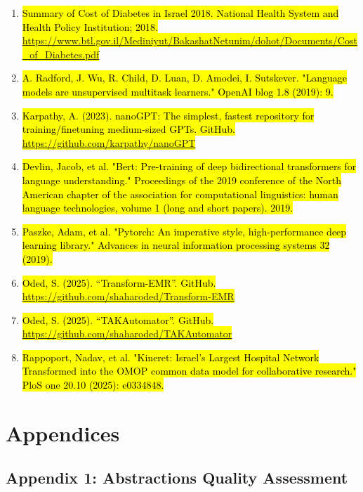 \documentclass[
]{article}
\begin{document}
\begin{enumerate}
\def\labelenumi{\arabic{enumi}.}
\setcounter{enumi}{26}
\item
  \hl{Summary of Cost of Diabetes in Israel 2018. National Health System
  and Health Policy Institution; 2018.
  \mbox{\href{https://www.btl.gov.il/Mediniyut/BakashatNetunim/dohot/Documents/Cost_of_Diabetes.pdf}{\ul{https://www.btl.gov.il/Mediniyut/BakashatNetunim/dohot/Documents/Cost\_of\_Diabetes.pdf}}}}
\item
  \hl{A. Radford, J. Wu, R. Child, D. Luan, D. Amodei, I. Sutskever.
  "Language models are unsupervised multitask learners." OpenAI blog 1.8
  (2019): 9.‏}
\item
  \hl{Karpathy, A. (2023). nanoGPT: The simplest, fastest repository for
  training/finetuning medium-sized GPTs. GitHub.
  \mbox{\href{https://github.com/karpathy/nanoGPT}{\ul{https://github.com/karpathy/nanoGPT}}}}
\item
  \hl{Devlin, Jacob, et al. "Bert: Pre-training of deep bidirectional
  transformers for language understanding." Proceedings of the 2019
  conference of the North American chapter of the association for
  computational linguistics: human language technologies, volume 1 (long
  and short papers). 2019.‏}
\item
  \hl{Paszke, Adam, et al. "Pytorch: An imperative style,
  high-performance deep learning library." Advances in neural
  information processing systems 32 (2019).‏}
\item
  \hl{Oded, S. (2025). ``Transform-EMR''. GitHub.
  \mbox{\href{https://github.com/shaharoded/Transform-EMR}{\ul{https://github.com/shaharoded/Transform-EMR}}}}
\item
  \hl{Oded, S. (2025). ``TAKAutomator''. GitHub.
  \mbox{\href{https://github.com/shaharoded/TAKAutomator}{\ul{https://github.com/shaharoded/TAKAutomator}}}}
\item
  \hl{Rappoport, Nadav, et al. "Kineret: Israel's Largest Hospital
  Network Transformed into the OMOP common data model for collaborative
  research." PloS one 20.10 (2025): e0334848.‏}
\end{enumerate}

\section{Appendices}\label{appendices}

\subsection{Appendix 1: Abstractions Quality
Assessment}\label{appendix-1-abstractions-quality-assessment}
\end{document}
